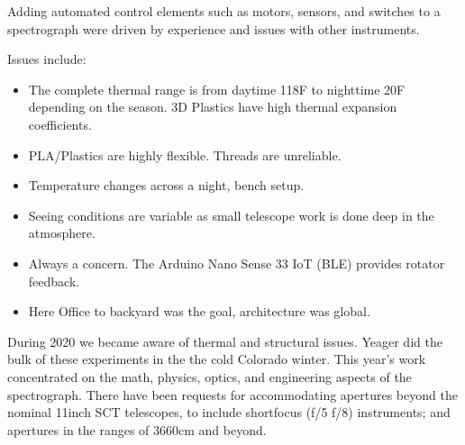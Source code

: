 \documentclass[letterpaper,10pt,english,openany,oneside]{sphinxmanual}
\begin{document}
\sphinxAtStartPar
Adding automated control elements such as motors, sensors, and
switches to a spectrograph were driven by experience and issues with
other instruments.

\sphinxAtStartPar
Issues include:
\begin{itemize}
\item {} 
\sphinxAtStartPar
{} The complete thermal range is from daytime 118F to nighttime \sphinxhyphen{}20F depending on the season. 3D Plastics have high thermal expansion coefficients.

\item {} 
\sphinxAtStartPar
{} PLA/Plastics are highly flexible. Threads are unreliable.

\item {} 
\sphinxAtStartPar
{} Temperature changes across a night, bench setup.

\item {} 
\sphinxAtStartPar
{} Seeing conditions are variable as small telescope work is done deep in the atmosphere.

\item {} 
\sphinxAtStartPar
{} Always a concern. The Arduino Nano Sense 33 IoT (BLE) provides rotator feedback.

\item {} 
\sphinxAtStartPar
{} Here Office to backyard was the goal, architecture was global.

\end{itemize}

\sphinxAtStartPar
During 2020 we became aware of thermal and structural issues. Yeager
did the bulk of these experiments in the the cold Colorado winter.
This year’s work concentrated on the math, physics, optics, and
engineering aspects of the spectrograph. There have been requests for
accommodating apertures beyond the nominal 11\sphinxhyphen{}inch SCT telescopes, to
include short\sphinxhyphen{}focus (f/5 \sphinxhyphen{} f/8) instruments; and apertures in the
ranges of 36\sphinxhyphen{}60cm and beyond.
\end{document}
